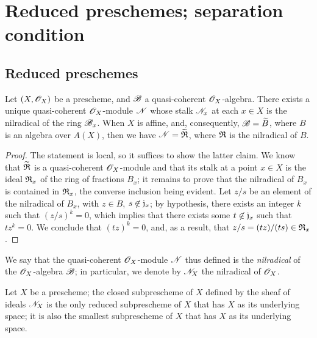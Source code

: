 \section{Reduced preschemes; separation condition}
\label{section-reduced-preschemes-and-separation-condition}

\subsection{Reduced preschemes}
\label{subsection-reduced-preschemes}

\begin{prop}[5.1.1]
\label{1.5.1.1}
Let $(X,\mathscr{O}_X)$ be a prescheme, and $\mathscr{B}$ a quasi-coherent $\mathscr{O}_X$-algebra.
There exists a unique quasi-coherent $\mathscr{O}_X$-module $\mathscr{N}$ whose stalk $\mathscr{N}_x$ at each $x\in X$ is the nilradical of the ring $\mathscr{B}_x$.
When $X$ is affine, and, consequently, $\mathscr{B}=\widetilde{B}$, where $B$ is an algebra over $A(X)$, then we have $\mathscr{N}=\widetilde{\mathfrak{R}}$, where $\mathfrak{R}$ is the nilradical of $B$.
\end{prop}

\begin{proof}
\label{proof-1.5.1.1}
The statement is local, so it suffices to show the latter claim.
We know that $\widetilde{\mathfrak{R}}$ is a quasi-coherent $\mathscr{O}_X$-module  and that its stalk at a point $x\in X$ is the ideal $\mathfrak{R}_x$ of the ring of fractions $B_x$;
it remains to prove that the nilradical of $B_x$ is contained in $\mathfrak{R}_x$, the converse inclusion being evident.
Let $z/s$ be an element of the nilradical of $B_x$, with $z\in B$, $s\not\in\mathfrak{j}_x$;
by hypothesis, there exists an integer $k$ such that $(z/s)^k=0$, which implies that there exists some $t\not\in\mathfrak{j}_x$ such that $tz^k=0$.
We conclude that $(tz)^k=0$, and, as a result, that $z/s=(tz)/(ts)\in\mathfrak{R}_x$.
\end{proof}

We say that the quasi-coherent $\mathscr{O}_X$-module $\mathscr{N}$ thus defined is the \emph{nilradical} of the $\mathscr{O}_X$-algebra $\mathscr{B}$; in particular, we denote by $\mathscr{N}_X$ the nilradical of $\mathscr{O}_X$.

\begin{cor}[5.1.2]
\label{1.5.1.2}
Let $X$ be a prescheme;
the closed subprescheme of $X$ defined by the sheaf of ideals $\mathscr{N}_X$ is the only reduced subprescheme  of $X$ that has $X$ as its underlying space;
it is also the smallest subprescheme of $X$ that has $X$ as its underlying space.
\end{cor}

